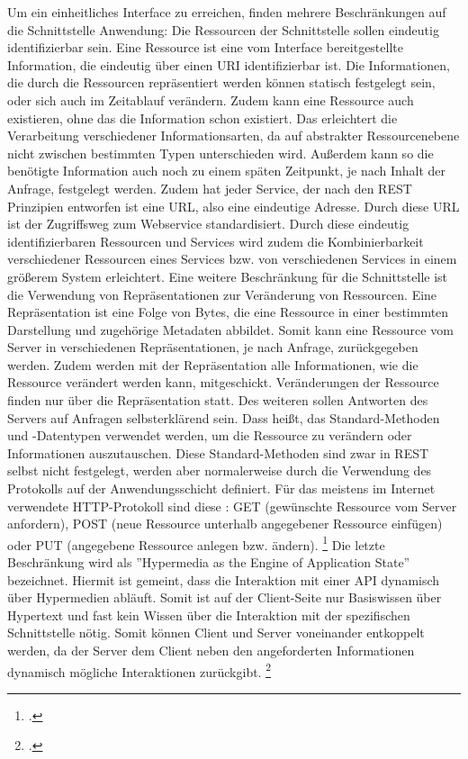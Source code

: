 Um ein einheitliches Interface zu erreichen, finden mehrere Beschränkungen auf die Schnittstelle Anwendung: Die Ressourcen der Schnittstelle sollen eindeutig identifizierbar sein. Eine Ressource ist eine vom Interface bereitgestellte Information, die eindeutig über einen URI identifizierbar ist. Die Informationen, die durch die Ressourcen repräsentiert werden können statisch festgelegt sein, oder sich auch im Zeitablauf verändern. Zudem kann eine Ressource auch existieren, ohne das die Information schon existiert. Das erleichtert die Verarbeitung verschiedener Informationsarten, da auf abstrakter Ressourcenebene nicht zwischen bestimmten Typen unterschieden wird. Au{\ss}erdem kann so die benötigte Information auch noch zu einem späten Zeitpunkt, je nach Inhalt der Anfrage, festgelegt werden. Zudem hat jeder Service, der nach den REST Prinzipien entworfen ist eine URL, also eine eindeutige Adresse. Durch diese URL ist der Zugriffsweg zum Webservice standardisiert. Durch diese eindeutig identifizierbaren Ressourcen und Services wird zudem die Kombinierbarkeit verschiedener Ressourcen eines Services bzw. von verschiedenen Services in einem grö{\ss}erem System erleichtert. Eine weitere Beschränkung für die Schnittstelle ist die Verwendung von Repräsentationen zur Veränderung von Ressourcen. Eine Repräsentation ist eine Folge von Bytes, die eine Ressource in einer bestimmten Darstellung und zugehörige Metadaten abbildet. Somit kann eine Ressource vom Server in verschiedenen Repräsentationen, je nach Anfrage, zurückgegeben werden. Zudem werden mit der Repräsentation alle Informationen, wie die Ressource verändert werden kann, mitgeschickt. Veränderungen der Ressource finden nur über die Repräsentation statt. Des weiteren sollen Antworten des Servers auf Anfragen selbsterklärend sein. Dass hei{\ss}t, das Standard-Methoden und -Datentypen verwendet werden, um die Ressource zu verändern oder Informationen auszutauschen. Diese Standard-Methoden sind zwar in REST selbst nicht festgelegt, werden aber normalerweise durch die Verwendung des Protokolls auf der Anwendungsschicht definiert. Für das meistens im Internet verwendete HTTP-Protokoll sind diese \zB: GET (gewünschte Ressource vom Server anfordern), POST (neue Ressource unterhalb angegebener Ressource einfügen) oder PUT (angegebene Ressource anlegen bzw. ändern). \footcite[Vgl.][]{fielding_rest_2008} Die letzte Beschränkung wird als ''Hypermedia as the Engine of Application State'' bezeichnet. Hiermit ist gemeint, dass die Interaktion mit einer API dynamisch über Hypermedien abläuft. Somit ist auf der Client-Seite nur Basiswissen über Hypertext und fast kein Wissen über die Interaktion mit der spezifischen Schnittstelle nötig. Somit können Client und Server voneinander entkoppelt werden, da der Server dem Client neben den angeforderten Informationen dynamisch mögliche Interaktionen zurückgibt. \footcite[Vgl.][S. 81f]{fielding_architectural_2000}


